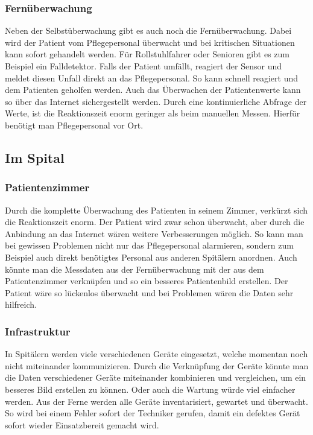 \subsubsection{Fernüberwachung}
Neben der Selbstüberwachung gibt es auch noch die Fernüberwachung. Dabei wird der Patient vom Pflegepersonal überwacht und bei kritischen Situationen kann sofort gehandelt werden. Für Rollstuhlfahrer oder Senioren gibt es zum Beispiel ein Falldetektor. Falls der Patient umfällt, reagiert der Sensor und meldet diesen Unfall direkt an das Pflegepersonal. So kann schnell reagiert und dem Patienten geholfen werden. Auch das Überwachen der Patientenwerte kann so über das Internet sichergestellt werden. Durch eine kontinuierliche Abfrage der Werte, ist die Reaktionszeit enorm geringer als beim manuellen Messen. Hierfür benötigt man Pflegepersonal vor Ort.
\subsection{Im Spital}
\subsubsection{Patientenzimmer}
Durch die komplette Überwachung des Patienten in seinem Zimmer, verkürzt sich die Reaktionszeit enorm. Der Patient wird zwar schon überwacht, aber durch die Anbindung an das Internet wären weitere Verbesserungen möglich. So kann man bei gewissen Problemen nicht nur das Pflegepersonal alarmieren, sondern zum Beispiel auch direkt benötigtes Personal aus anderen Spitälern anordnen. Auch könnte man die Messdaten aus der Fernüberwachung mit der aus dem Patientenzimmer verknüpfen und so ein besseres Patientenbild erstellen. Der Patient wäre so lückenlos überwacht und bei Problemen wären die Daten sehr hilfreich.
\subsubsection{Infrastruktur}
In Spitälern werden viele verschiedenen Geräte eingesetzt, welche momentan noch nicht miteinander kommunizieren. Durch die Verknüpfung der Geräte könnte man die Daten verschiedener Geräte miteinander kombinieren und vergleichen, um ein besseres Bild erstellen zu können. Oder auch die Wartung würde viel einfacher werden. Aus der Ferne werden alle Geräte inventarisiert, gewartet und überwacht. So wird bei einem Fehler sofort der Techniker gerufen, damit ein defektes Gerät sofort wieder Einsatzbereit gemacht wird.
 
\newpage

